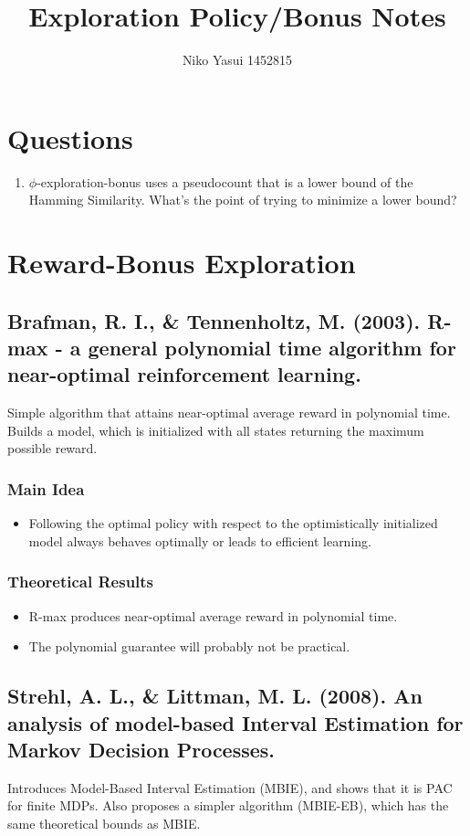 \documentclass[12pt, oneside]{amsart}
\title{Exploration Policy/Bonus Notes}
\author{Niko Yasui 1452815}
\begin{document}
	
	\maketitle

\section*{Questions}
\begin{enumerate}
	\item $\phi$-exploration-bonus uses a pseudocount that is a lower bound of the Hamming Similarity. What's the point of trying to minimize a lower bound?
\end{enumerate}

\section*{Reward-Bonus Exploration}

\subsection*{Brafman, R. I., \& Tennenholtz, M. (2003). R-max - a general polynomial time algorithm for near-optimal reinforcement learning.}
Simple algorithm that attains near-optimal average reward in polynomial time. Builds a model, which is initialized with all states returning the maximum possible reward. 
\subsubsection*{Main Idea}
\begin{itemize}
	\item Following the optimal policy with respect to the optimistically initialized model always behaves optimally or leads to efficient learning. 
\end{itemize}

\subsubsection*{Theoretical Results}
\begin{itemize}
	\item R-max produces near-optimal average reward in polynomial time. 
	\item The polynomial guarantee will probably not be practical.
\end{itemize}

\subsection*{Strehl, A. L., \& Littman, M. L. (2008). An analysis of model-based Interval Estimation for Markov Decision Processes.}
Introduces Model-Based Interval Estimation (MBIE), and shows that it is PAC for finite MDPs. Also proposes a simpler algorithm (MBIE-EB), which has the same theoretical bounds as MBIE. 
\end{document}
